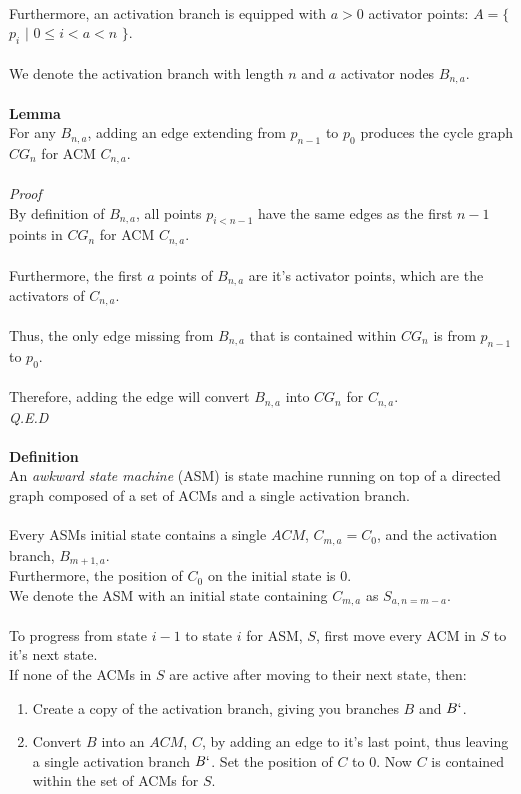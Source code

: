 \documentclass[a4paper,12pt]{article}
\begin{document}
\\
Furthermore, an activation branch is equipped with $a > 0$ activator points: $A = \{$ $p_i$ $|$ $0 \leq i < a < n$ $\}$.\\ 
\\
We denote the activation branch with length $n$ and $a$ activator nodes $B_{n,a}$.
\\
\\
\textbf{Lemma}\\
For any $B_{n,a}$, adding an edge extending from $p_{n-1}$ to $p_0$ produces the cycle graph $CG_n$ for ACM $C_{n,a}$.\\
\\
\textit{Proof}\\ 
By definition of $B_{n,a}$, all points $p_{i < n -1}$ have the same edges as the first $n - 1$ points in $CG_n$ for ACM $C_{n,a}$.\\
\\
Furthermore, the first $a$ points of $B_{n,a}$ are it's activator points, which are the activators of $C_{n,a}$.\\
\\
Thus, the only edge missing from $B_{n,a}$ that is contained within $CG_n$ is from  $p_{n-1}$ to $p_0$.\\
\\
Therefore, adding the edge will convert $B_{n,a}$ into $CG_n$ for $C_{n,a}$.\\
\textit{Q.E.D}\\
\\
\textbf{Definition}\\
An \textit{awkward state machine} (ASM) is state machine running on top of a directed graph composed of a set of ACMs and a single activation branch.\\
\\
Every ASMs initial state contains a single $ACM$, $C_{m,a} = C_0$, and the activation branch, $B_{m+1,a}$.\\
Furthermore, the position of $C_0$ on the initial state is $0$.\\
We denote the ASM with an initial state containing $C_{m,a}$ as $S_{a,n=m-a}$.\\
\\
To progress from state $i - 1$ to state $i$ for ASM, $S$, first move every ACM in $S$ to it's next state.\\
If none of the ACMs in $S$ are active after moving to their next state, then:
\begin{enumerate}
\item Create a copy of the activation branch, giving you branches $B$ and $B`$.
\item Convert $B$ into an $ACM$, $C$, by adding an edge to it's last point, thus leaving a single activation branch $B`$. Set the position of $C$ to $0$. Now $C$ is contained within the set of ACMs for $S$.
\end{enumerate}
\end{document}
